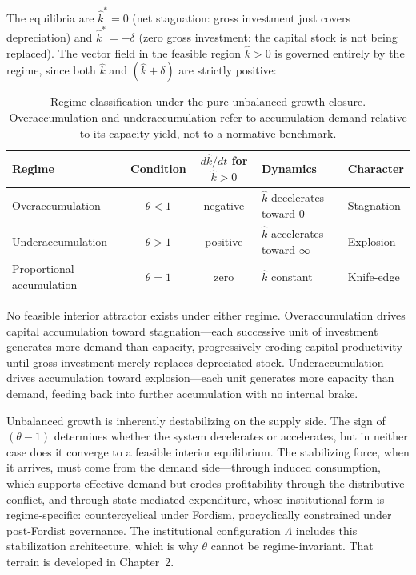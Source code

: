 The equilibria are $\hat{k}^* = 0$ (net stagnation: gross investment just covers depreciation) and $\hat{k}^* = -\delta$ (zero gross investment: the capital stock is not being replaced). The vector field in the feasible region $\hat{k} > 0$ is governed entirely by the regime, since both $\hat{k}$ and $(\hat{k} + \delta)$ are strictly positive:

\begin{table}[H]
	\centering
	\begin{tabular}{lccll}
		\toprule
		\textbf{Regime} & \textbf{Condition} & $d\hat{k}/dt$ for $\hat{k} > 0$ & \textbf{Dynamics} & \textbf{Character} \\
		\midrule
		Overaccumulation & $\theta < 1$ & negative & $\hat{k}$ decelerates toward 0 & Stagnation \\
		Underaccumulation & $\theta > 1$ & positive & $\hat{k}$ accelerates toward $\infty$ & Explosion \\
		Proportional accumulation & $\theta = 1$ & zero & $\hat{k}$ constant & Knife-edge \\
		\bottomrule
	\end{tabular}
	\caption{Regime classification under the pure unbalanced growth closure. Overaccumulation and underaccumulation refer to accumulation demand relative to its capacity yield, not to a normative benchmark.}
	\label{tab:regime_classification}
\end{table}

No feasible interior attractor exists under either regime. Overaccumulation drives capital accumulation toward stagnation---each successive unit of investment generates more demand than capacity, progressively eroding capital productivity until gross investment merely replaces depreciated stock. Underaccumulation drives accumulation toward explosion---each unit generates more capacity than demand, feeding back into further accumulation with no internal brake.

Unbalanced growth is inherently destabilizing on the supply side. The sign of $(\theta - 1)$ determines whether the system decelerates or accelerates, but in neither case does it converge to a feasible interior equilibrium. The stabilizing force, when it arrives, must come from the demand side---through induced consumption, which supports effective demand but erodes profitability through the distributive conflict, and through state-mediated expenditure, whose institutional form is regime-specific: countercyclical under Fordism, procyclically constrained under post-Fordist governance. The institutional configuration $\Lambda$ includes this stabilization architecture, which is why $\theta$ cannot be regime-invariant. That terrain is developed in Chapter~2.

